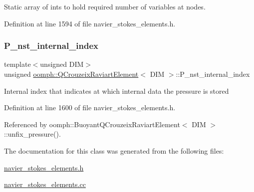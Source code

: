 Static array of ints to hold required number of variables at nodes. 



Definition at line 1594 of file navier\+\_\+stokes\+\_\+elements.\+h.

\mbox{\label{classoomph_1_1QCrouzeixRaviartElement_a50b6de74ff6201ea44db66c72063ecf4}} 
\subsubsection{\texorpdfstring{P\+\_\+nst\+\_\+internal\+\_\+index}{P\_nst\_internal\_index}}
{\footnotesize\ttfamily template$<$unsigned D\+IM$>$ \\
unsigned \hyperlink{classoomph_1_1QCrouzeixRaviartElement}{oomph\+::\+Q\+Crouzeix\+Raviart\+Element}$<$ D\+IM $>$\+::P\+\_\+nst\+\_\+internal\+\_\+index\hspace{0.3cm}{\ttfamily [protected]}}

Internal index that indicates at which internal data the pressure is stored 

Definition at line 1600 of file navier\+\_\+stokes\+\_\+elements.\+h.



Referenced by oomph\+::\+Buoyant\+Q\+Crouzeix\+Raviart\+Element$<$ D\+I\+M $>$\+::unfix\+\_\+pressure().



The documentation for this class was generated from the following files\+:\begin{DoxyCompactItemize}
\item 
\hyperlink{navier__stokes__elements_8h}{navier\+\_\+stokes\+\_\+elements.\+h}\item 
\hyperlink{navier__stokes__elements_8cc}{navier\+\_\+stokes\+\_\+elements.\+cc}\end{DoxyCompactItemize}
